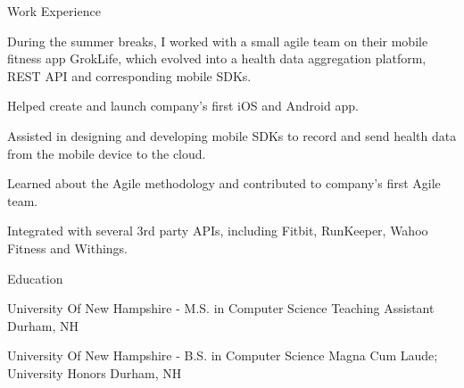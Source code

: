 \documentclass[UKenglish]{resume} %
\begin{document}
\begin{rSection}{Work Experience}
\begin{rSubsection}
        During the summer breaks, I worked with a small agile team on their mobile fitness app GrokLife, which evolved into a health data aggregation platform, REST API and corresponding mobile SDKs.
        \item Helped create and launch company’s first iOS and Android app.
        \item Assisted in designing and developing mobile SDKs to record and send health data from the mobile device to the cloud.
        \item Learned about the Agile methodology and contributed to company's first Agile team.
        \item Integrated with several 3rd party APIs, including Fitbit, RunKeeper, Wahoo Fitness and Withings.
    \end{rSubsection}

\end{rSection}



\begin{rSection}{ Education }

    \rSubsectionHeading
        {University Of New Hampshire}
        {  -  }
        {\normalfont M.S. in Computer Science}
        {\normalfont Teaching Assistant}
        {Durham, NH}

    \rSubsectionHeading
        {University Of New Hampshire}
        {  -  }
        {\normalfont B.S. in Computer Science}
        {\normalfont Magna Cum Laude; University Honors}
        {Durham, NH}

\end{rSection}
\end{document}
